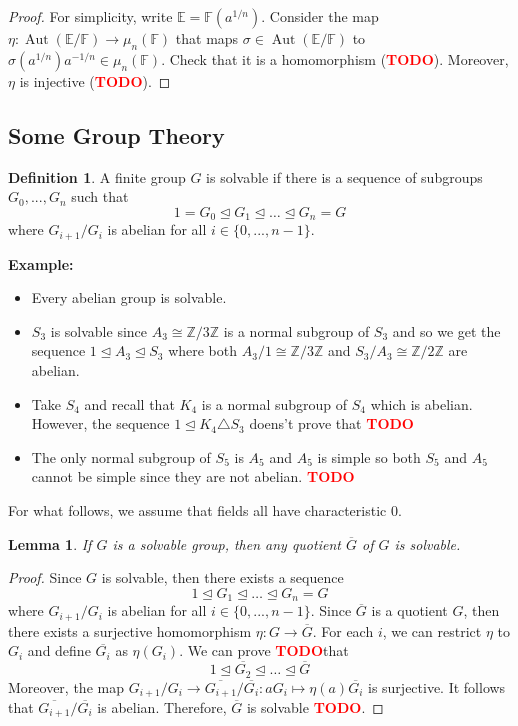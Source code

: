 \documentclass{article}
\theoremstyle{plain}
\newtheorem{lemma}[theorem]{Lemma}
\theoremstyle{definition}
\newtheorem*{definition}{Definition}
\newcommand{\F}{\mathbb{F}}
\newcommand{\E}{\mathbb{E}}
\newcommand{\Zn}[1]{\mathbb{Z}/ #1 \mathbb{Z}}
\DeclareMathOperator{\Aut}{Aut}
\newcommand{\td}{\textcolor{red}{\textbf{TODO}}}
\newcommand{\isomorphic}{\cong}
\newenvironment{example}{\noindent\textbf{Example:} \vspace{-0.2cm}\begin{itemize}}{\end{itemize}}
\begin{document}
\begin{proof}
    For simplicity, write $\E = \F(a^{1/n})$. Consider the map $\eta : \Aut(\E / \F) \to \mu_n(\F)$ that maps $\sigma \in \Aut(\E / \F)$ to $\sigma(a^{1/n})a^{-1/n} \in \mu_n(\F)$. Check that it is a homomorphism (\td). Moreover, $\eta$ is injective (\td).
\end{proof}

\subsection{Some Group Theory}

\begin{definition}
    A finite group $G$ is solvable if there is a sequence of subgroups $G_0, ..., G_n$ such that
    $$1 = G_0 \trianglelefteq G_1 \trianglelefteq \dots \trianglelefteq G_n = G$$
    where $G_{i+1}/G_i$ is abelian for all $i \in \{0, ..., n-1\}$.
\end{definition}

\begin{example}
    \item Every abelian group is solvable.
    \item $S_3$ is solvable since $A_3 \isomorphic \Zn{3}$ is a normal subgroup of $S_3$ and so we get the sequence $1 \trianglelefteq A_3 \trianglelefteq S_3$ where both $A_3 / 1 \isomorphic \Zn{3}$ and $S_3 / A_3 \isomorphic \Zn{2}$ are abelian.
    \item Take $S_4$ and recall that $K_4$ is a normal subgroup of $S_4$ which is abelian. However, the sequence $1 \trianglelefteq K_4 \triangle S_3$ doens't prove that \td 
    \item The only normal subgroup of $S_5$ is $A_5$ and $A_5$ is simple so both $S_5$ and $A_5$ cannot be simple since they are not abelian. \td 
\end{example}

For what follows, we assume that fields all have characteristic 0.

\begin{lemma}
    If $G$ is a solvable group, then any quotient $\overline{G}$ of $G$ is solvable.
\end{lemma}

\begin{proof}
    Since $G$ is solvable, then there exists a sequence
    $$1  \trianglelefteq G_1 \trianglelefteq \dots \trianglelefteq G_n = G$$
    where $G_{i+1}/G_i$ is abelian for all $i \in \{0, ..., n-1\}$. Since $\overline{G}$ is a quotient $G$, then there exists a surjective homomorphism $\eta : G \to \overline{G}$. For each $i$, we can restrict $\eta$ to $G_i$ and define $\overline{G_i}$ as $\eta(G_i)$. We can prove \td that 
    $$1  \trianglelefteq \overline{G_2} \trianglelefteq \dots \trianglelefteq  \overline{G}$$
    Moreover, the map $G_{i+1}/G_i \to \overline{G_{i+1}}/\overline{G_i} : aG_i \mapsto \eta(a) \overline{G_i}$ is surjective. It follows that $\overline{G_{i+1}}/\overline{G_i}$ is abelian. Therefore, $\overline{G}$ is solvable \td .
\end{proof}
\end{document}
